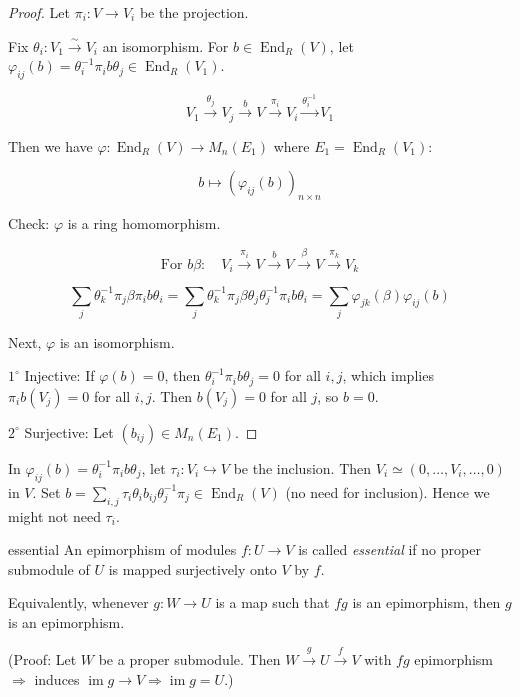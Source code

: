 \documentclass[11pt, a4paper]{report}
\begin{document}
\begin{proof}
Let $\pi_{i}: V \rightarrow V_{i}$ be the projection.

Fix $\theta_{i}: V_{1} \xrightarrow{\sim} V_{i}$ an isomorphism. For $b \in \operatorname{End}_{R}(V)$, let $\varphi_{ij}(b) = \theta_{i}^{-1} \pi_{i} b \theta_{j} \in \operatorname{End}_{R}(V_{1})$.

\[
V_{1} \xrightarrow{\theta_{j}} V_{j} \xrightarrow{b} V \xrightarrow{\pi_{i}} V_{i} \xrightarrow{\theta_{i}^{-1}} V_{1}
\]

Then we have $\varphi: \operatorname{End}_{R}(V) \rightarrow M_{n}(E_{1})$ where $E_{1} = \operatorname{End}_{R}(V_{1})$:

\[
b \mapsto \left(\varphi_{ij}(b)\right)_{n \times n}
\]

Check: $\varphi$ is a ring homomorphism.

\[
\text{For } b\beta: \quad V_{i} \xrightarrow{\pi_{i}} V \xrightarrow{b} V \xrightarrow{\beta} V \xrightarrow{\pi_{k}} V_{k}
\]

\[
\sum_{j} \theta_{k}^{-1} \pi_{j} \beta \pi_{i} b \theta_{i} = \sum_{j} \theta_{k}^{-1} \pi_{j} \beta \theta_{j} \theta_{j}^{-1} \pi_{i} b \theta_{i} = \sum_{j} \varphi_{jk}(\beta) \varphi_{ij}(b)
\]

Next, $\varphi$ is an isomorphism.

$1^{\circ}$ Injective: If $\varphi(b) = 0$, then $\theta_{i}^{-1} \pi_{i} b \theta_{j} = 0$ for all $i, j$, which implies $\pi_{i} b(V_{j}) = 0$ for all $i, j$. Then $b(V_{j}) = 0$ for all $j$, so $b = 0$.

$2^{\circ}$ Surjective: Let $(b_{ij}) \in M_{n}(E_{1})$.
\end{proof}

\begin{remark}
In $\varphi_{ij}(b) = \theta_{i}^{-1} \pi_{i} b \theta_{j}$, let $\tau_{i}: V_{i} \hookrightarrow V$ be the inclusion. Then $V_{i} \simeq (0, \ldots, V_{i}, \ldots, 0)$ in $V$. Set $b = \sum_{i,j} \tau_{i} \theta_{i} b_{ij} \theta_{j}^{-1} \pi_{j} \in \operatorname{End}_{R}(V)$ (no need for inclusion). Hence we might not need $\tau_{i}$.
\end{remark}

\begin{definition}
essential
An epimorphism of modules $f: U \rightarrow V$ is called \emph{essential} if no proper submodule of $U$ is mapped surjectively onto $V$ by $f$.

Equivalently, whenever $g: W \rightarrow U$ is a map such that $fg$ is an epimorphism, then $g$ is an epimorphism.

(Proof: Let $W$ be a proper submodule. Then $W \xrightarrow{g} U \xrightarrow{f} V$ with $fg$ epimorphism $\Rightarrow$ induces $\operatorname{im} g \rightarrow V \Rightarrow \operatorname{im} g = U$.)

\end{definition}
\end{document}
